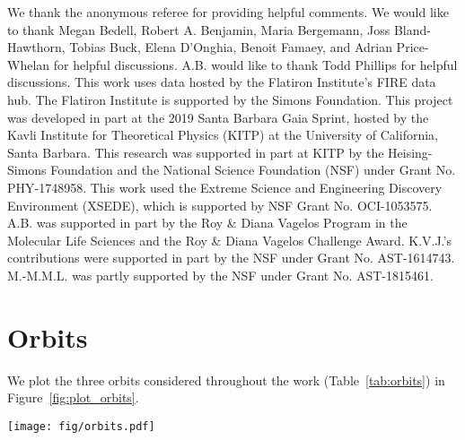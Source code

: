 \documentclass[twocolumn]{aastex62}
\newcommand{\thin}{\texttt{thin-disk}}
\newcommand{\thick}{\texttt{thick-disk}}
\newcommand{\halo}{\texttt{halo}}
\begin{document}
\acknowledgments
We thank the anonymous referee for providing helpful comments. We would like
to thank Megan Bedell, Robert A. Benjamin, Maria Bergemann, Joss
Bland-Hawthorn, Tobias Buck, Elena D'Onghia, Benoit Famaey, and Adrian
Price-Whelan for helpful discussions. A.B. would like to thank Todd Phillips
for helpful discussions. This work uses data hosted by the Flatiron
Institute's FIRE data hub. The Flatiron Institute is supported by the Simons Foundation. This project was developed in part at the 2019
Santa Barbara Gaia Sprint, hosted by the Kavli Institute for Theoretical
Physics (KITP) at the University of California, Santa Barbara. This research
was supported in part at KITP by the Heising-Simons Foundation and the
National Science Foundation (NSF) under Grant No. PHY-1748958. This work used
the Extreme Science and Engineering Discovery Environment (XSEDE), which is
supported by NSF Grant No. OCI-1053575. A.B. was supported in part by the Roy
\& Diana Vagelos Program in the Molecular Life Sciences and the Roy \& Diana
Vagelos Challenge Award. K.V.J.'s contributions were supported in part by the
NSF under Grant No. AST-1614743. M.-M.M.L. was partly supported by the NSF
under Grant No. AST-1815461.


\appendix
\section{Orbits} \label{app:orbits}
We plot the three orbits considered throughout the work
(Table~\ref{tab:orbits}) in Figure~\ref{fig:plot_orbits}.

\begin{figure*}[htb!]
\begin{center}
\texttt{[image: fig/orbits.pdf]}
\end{center}
\caption{The three orbits presented in Table~\ref{tab:orbits} and considered
throughout the work. We plot \thin{}, \thick{}, and \halo{} in the left,
center, and right columns, respectively. The upper row shows a plot of
$x$~vs.~$y$ while the lower row shows $R$~vs.~$z$.}
\label{fig:plot_orbits}
\end{figure*}
\end{document}
